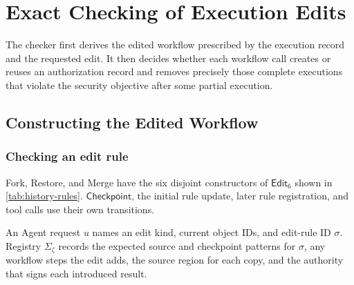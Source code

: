 \section{Exact Checking of Execution Edits}
\label{sec:exact-check}

The checker first derives the edited workflow prescribed by the execution record and the requested edit.
It then decides whether each workflow call creates or reuses an authorization record and removes precisely those complete executions that violate the security objective after some partial execution.

\subsection{Constructing the Edited Workflow}

\subsubsection{Checking an edit rule}

Fork, Restore, and Merge have the six disjoint constructors of \(\mathsf{Edit}_6\) shown in \cref{tab:history-rules}.
\(\mathsf{Checkpoint}\), the initial rule update, later rule registration, and tool calls use their own transitions.

An Agent request \(u\) names an edit kind, current object IDs, and edit-rule ID \(\sigma\).
Registry \(\Sigma_\zeta\) records the expected source and checkpoint patterns for \(\sigma\), any workflow steps the edit adds, the source region for each copy, and the authority that signs each introduced result.

